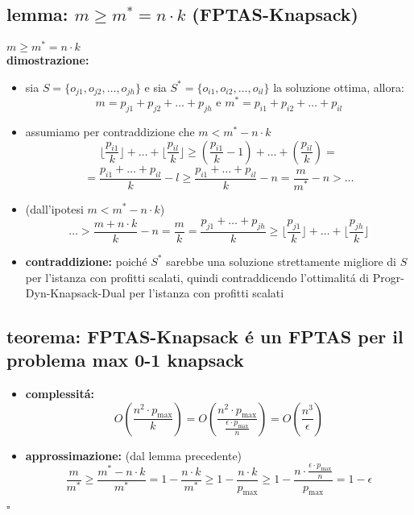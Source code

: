 \subsection*{lemma: $m\geq m^*=n\cdot k$ (FPTAS-Knapsack)}
\begin{flushleft}
	$m\geq m^*=n\cdot k$ \newline \\
	\textbf{dimostrazione:}
	\begin{itemize}
		\item sia $S=\{o_{j1},o_{j2},\ldots,o_{jh}\}$ e sia $S^*=\{o_{i1},o_{i2},\ldots,o_{il}\}$ la soluzione ottima, allora:
			$$m=p_{j1}+p_{j2}+\ldots+p_{jh}\text{ e }m^*=p_{i1}+p_{i2}+\ldots+p_{il}$$
		\item assumiamo per contraddizione che $m<m^*-n\cdot k$
			$$\lfloor\frac{p_{i1}}{k}\rfloor+\ldots+\lfloor\frac{p_{il}}{k}\rfloor\geq(\frac{p_{i1}}{k}-1)+\ldots+(\frac{p_{il}}{k})=$$
			$$=\frac{p_{i1}+\ldots+p_{il}}{k}-l\geq\frac{p_{i1}+\ldots+p_{il}}{k}-n=\frac{m}{m^*}-n>\ldots$$
		\item (dall'ipotesi $m<m^*-n\cdot k$)
			$$\ldots>\frac{m+n\cdot
			k}{k}-n=\frac{m}{k}=\frac{p_{j1}+\ldots+p_{jh}}{k}\geq\lfloor\frac{p_{j1}}{k}\rfloor+\ldots+\lfloor\frac{p_{jh}}{k}\rfloor$$
		\item \textbf{contraddizione:} poich\'e $S^*$ sarebbe una soluzione strettamente migliore di $S$ per l'istanza con profitti scalati, quindi contraddicendo l'ottimalit\'a di Progr-Dyn-Knapsack-Dual per l'istanza con profitti scalati
	\end{itemize}
\end{flushleft}


\subsection*{teorema: FPTAS-Knapsack \'e un FPTAS per il problema max 0-1 knapsack}
\begin{flushleft}
	\begin{itemize}
		\item \textbf{complessit\'a:}
			$$O(\frac{n^2\cdot p_\max}{k})=O(\frac{n^2\cdot p_\max}{\frac{\epsilon\cdot
			p_\max}{n}})=O(\frac{n^3}{\epsilon})$$
		\item \textbf{approssimazione:} (dal lemma precedente)
			$$\frac{m}{m^*}\geq\frac{m^*-n\cdot k}{m^*}=1-\frac{n\cdot k}{m^*}\geq1-\frac{n\cdot k}{p_{\max}}\geq 1-\frac{n\cdot\frac{\epsilon\cdot p_{\max}}{n}}{p_{\max}}=1-\epsilon$$
	\end{itemize}
	\hfill$\square$
\end{flushleft}

